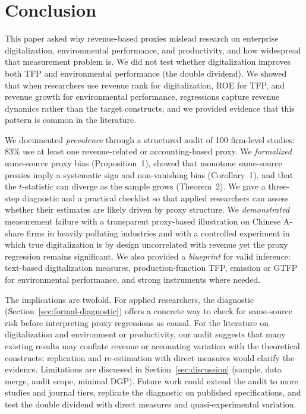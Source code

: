 
\section{Conclusion}
\label{sec:conclusion}

This paper asked why revenue-based proxies mislead research on enterprise digitalization, environmental performance, and productivity, and how widespread that measurement problem is. We did not test whether digitalization improves both TFP and environmental performance (the double dividend). We showed that when researchers use revenue rank for digitalization, ROE for TFP, and revenue growth for environmental performance, regressions capture revenue dynamics rather than the target constructs, and we provided evidence that this pattern is common in the literature.

We documented \emph{prevalence} through a structured audit of 100 firm-level studies: 83\% use at least one revenue-related or accounting-based proxy. We \emph{formalized} same-source proxy bias (Proposition~1), showed that monotone same-source proxies imply a systematic sign and non-vanishing bias (Corollary~1), and that the $t$-statistic can diverge as the sample grows (Theorem~2). We gave a three-step diagnostic and a practical checklist so that applied researchers can assess whether their estimates are likely driven by proxy structure. We \emph{demonstrated} measurement failure with a transparent proxy-based illustration on Chinese A-share firms in heavily polluting industries and with a controlled experiment in which true digitalization is by design uncorrelated with revenue yet the proxy regression remains significant. We also provided a \emph{blueprint} for valid inference: text-based digitalization measures, production-function TFP, emission or GTFP for environmental performance, and strong instruments where needed.

The implications are twofold. For applied researchers, the diagnostic (Section~\ref{sec:formal-diagnostic}) offers a concrete way to check for same-source risk before interpreting proxy regressions as causal. For the literature on digitalization and environment or productivity, our audit suggests that many existing results may conflate revenue or accounting variation with the theoretical constructs; replication and re-estimation with direct measures would clarify the evidence. Limitations are discussed in Section~\ref{sec:discussion} (sample, data merge, audit scope, minimal DGP). Future work could extend the audit to more studies and journal tiers, replicate the diagnostic on published specifications, and test the double dividend with direct measures and quasi-experimental variation.

